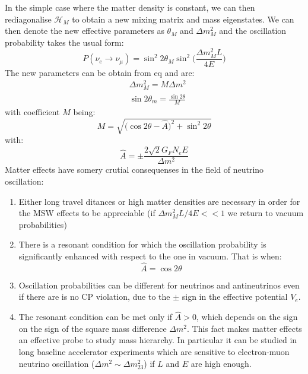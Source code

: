 \documentclass[12pt,a4paper,openright,twoside]{report}
\begin{document}
In the simple case where the matter density is constant, we can then rediagonalise $\mathcal{H}_M$ to obtain a new mixing matrix and mass eigenstates. We can then denote the new effective parameters as $\theta_M$ and $\Delta m_M^2$ and the oscillation probability takes the usual form:
\begin{equation}
P(\nu_e \rightarrow \nu_\mu)= \sin ^2 2 \theta_M \sin ^2 \bigg(\frac{\Delta m_M^2L}{4E}\bigg)
\end{equation}
The new parameters can be obtain from eq and are:
\begin{equation}
\begin{split}
&\Delta m^2_M =M\Delta m^2\\[8 pt]
&\sin 2\theta_m =\frac{\sin 2\theta}{M}
\end{split}
\end{equation}
with coefficient $M$ being:
\begin{equation}
M=\sqrt{\bigg(\cos 2\theta - \hat{A}\bigg)^2 + \sin^2 2 \theta}
\end{equation}
with:
\begin{equation}
\hat{A}=\pm \frac{2 \sqrt{2}G_FN_eE}{\Delta m^2}
\end{equation}
Matter effects have somery crutial consequenses in the field of neutrino oscillation:
\begin{enumerate}
	\item Either long travel ditances or high matter densities are necessary in order for the MSW effects to be appreciable (if $\Delta m_M^2L/4E << 1$ we return to vacuum probabilities)
	\item There is a resonant condition for which the oscillation probability is significantly enhanced with respect to the one in vacuum. That is when:
	\begin{equation}
	\hat{A} = \cos 2\theta
	\end{equation} 
	\item Oscillation probabilities can be different for neutrinos and antineutrinos even if there are is no CP violation, due to the $\pm$ sign in the effective potential $V_e$.
	\item The resonant condition can be met only if $\hat{A} > 0$, which depends on the sign on the sign of the square mass difference $\Delta m^2$. This fact makes matter effects an effective probe to study mass hierarchy. In particular it can be studied in long baseline accelerator experiments which are sensitive to electron-muon neutrino oscillation ($\Delta m^2 \sim \Delta m_{23}^2$) if $L$ and $E$ are high enough.
\end{enumerate}
\end{document}

